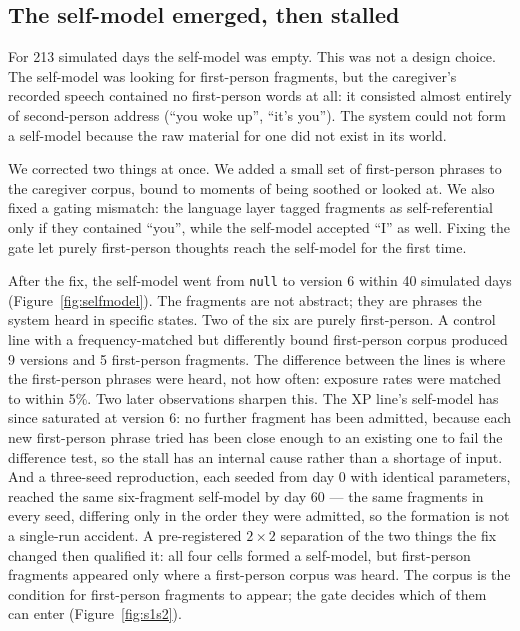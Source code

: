 \documentclass[11pt]{article}
\begin{document}
\subsection{The self-model emerged, then stalled}

For 213 simulated days the self-model was empty. This was not a design choice. The self-model was looking for first-person fragments, but the caregiver's recorded speech contained no first-person words at all: it consisted almost entirely of second-person address (``you woke up'', ``it's you''). The system could not form a self-model because the raw material for one did not exist in its world.

We corrected two things at once. We added a small set of first-person phrases to the caregiver corpus, bound to moments of being soothed or looked at. We also fixed a gating mismatch: the language layer tagged fragments as self-referential only if they contained ``you'', while the self-model accepted ``I'' as well. Fixing the gate let purely first-person thoughts reach the self-model for the first time.

After the fix, the self-model went from \texttt{null} to version 6 within 40 simulated days (Figure~\ref{fig:selfmodel}). The fragments are not abstract; they are phrases the system heard in specific states. Two of the six are purely first-person. A control line with a frequency-matched but differently bound first-person corpus produced 9 versions and 5 first-person fragments. The difference between the lines is where the first-person phrases were heard, not how often: exposure rates were matched to within 5\%. Two later observations sharpen this. The XP line's self-model has since saturated at version 6: no further fragment has been admitted, because each new first-person phrase tried has been close enough to an existing one to fail the difference test, so the stall has an internal cause rather than a shortage of input. And a three-seed reproduction, each seeded from day 0 with identical parameters, reached the same six-fragment self-model by day $60$ --- the same fragments in every seed, differing only in the order they were admitted, so the formation is not a single-run accident. A pre-registered $2\times2$ separation of the two things the fix changed then qualified it: all four cells formed a self-model, but first-person fragments appeared only where a first-person corpus was heard. The corpus is the condition for first-person fragments to appear; the gate decides which of them can enter (Figure~\ref{fig:s1s2}).
\end{document}
